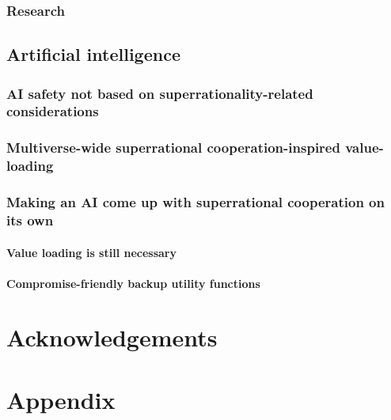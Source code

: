 \documentclass{book}
\begin{document}
\subsection{Research}
\label{Research}

\section{Artificial intelligence}
\label{Artificial intelligence}

\subsection{AI safety not based on superrationality-related considerations}
\label{AI safety not based on superrationality-related considerations}

\subsection{Multiverse-wide superrational cooperation-inspired value-loading}
\label{Multiverse-wide superrational cooperation-inspired value-loading}

\subsection{Making an AI come up with superrational cooperation on its own}
\label{Making an AI come up with superrational cooperation on its own}

\subsubsection{Value loading is still necessary}
\label{Value loading is still necessary}

\subsubsection{Compromise-friendly backup utility functions}
\label{Compromise-friendly backup utility functions}


\chapter{Acknowledgements}


\chapter{Appendix}
\label{Appendix}
\end{document}
